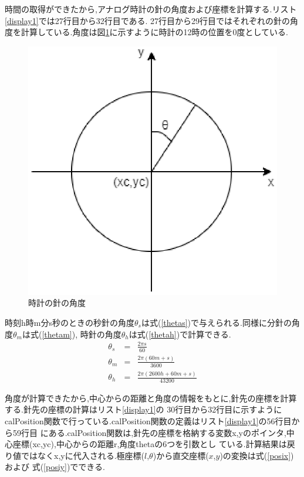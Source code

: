 \documentclass[a4j]{jarticle}
\begin{document}
            時間の取得ができたから,アナログ時計の針の角度および座標を計算する.リスト\ref{display1}では27行目から32行目である.
            27行目から29行目ではそれぞれの針の角度を計算している.角度は図\ref{tokei}に示すように時計の12時の位置を0度としている.
    \begin{figure}[H]
      \centering
      \includegraphics[scale=0.6]{tokei.eps}
      \caption{時計の針の角度}
       \label{tokei}
      \end{figure}

      時刻h時m分s秒のときの秒針の角度$\theta_s$は式(\ref{thetas})で与えられる.同様に分針の角度$\theta_m$は式(\ref{thetam}),
      時針の角度$\theta_h$は式(\ref{thetah})で計算できる.
          \begin{eqnarray}
            \label{thetas}
      \theta_s &=& \frac{2\pi s}{60}  \\
            \label{thetam}
      \theta_m &=& \frac{2\pi(60m+s)}{3600}  \\
            \label{thetah}
      \theta_h &=& \frac{2\pi(2600h+60m+s)}{43200}
        \end{eqnarray}

        角度が計算できたから,中心からの距離と角度の情報をもとに,針先の座標を計算する.針先の座標の計算はリスト\ref{display1}の
        30行目から32行目に示すようにcalPosition関数で行っている.calPosition関数の定義はリスト\ref{display1}の56行目から59行目
        にある.calPosition関数は,針先の座標を格納する変数x,yのポインタ,中心座標(xc,yc),中心からの距離r,角度thetaの6つを引数とし
        ている.計算結果は戻り値ではなくx,yに代入される.極座標($l$,$\theta$)から直交座標($x$,$y$)の変換は式(\ref{posix})および
        式(\ref{posiy})でできる.
\end{document}
